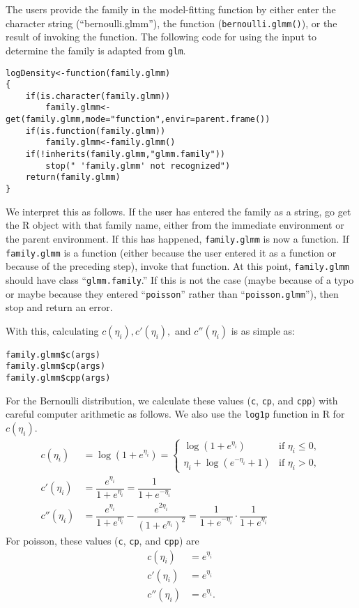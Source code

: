 \documentclass{article}
\begin{document}
The users provide the family in the model-fitting function by either enter the character string (``bernoulli.glmm''), the function (\texttt{bernoulli.glmm()}), or the result of invoking the function.  The following code for using the input to determine the family is adapted from \texttt{glm}.

\begin{verbatim}
logDensity<-function(family.glmm)
{
	if(is.character(family.glmm))
		family.glmm<-get(family.glmm,mode="function",envir=parent.frame())
	if(is.function(family.glmm))
		family.glmm<-family.glmm()
	if(!inherits(family.glmm,"glmm.family")) 
		stop(" 'family.glmm' not recognized") 
	return(family.glmm)
}
\end{verbatim}
We interpret this as follows.  If the user has entered the family as a string, go get the R object with that family name, either from the immediate environment or the parent environment.  If this has happened, \texttt{family.glmm} is now a function.  If \texttt{family.glmm} is a function (either because the user entered it as a function or because of the preceding step), invoke that function.  At this point, \texttt{family.glmm} should have  class ``\texttt{glmm.family}.'' If this is not the case (maybe because of a typo or maybe because they entered ``\texttt{poisson}'' rather than ``\texttt{poisson.glmm}''), then stop and return an error.

With this, calculating $c(\eta_i), c'(\eta_i),$ and  $c''(\eta_i)$ is as simple as: 
\begin{verbatim}
family.glmm$c(args)
family.glmm$cp(args)
family.glmm$cpp(args)
\end{verbatim}

For the Bernoulli distribution, we calculate these values (\texttt{c}, \texttt{cp}, and \texttt{cpp}) with careful computer arithmetic as follows. We also use the \texttt{log1p} function in R for $c(\eta_i)$. 
\begin{align}
c(\eta_i) &= \log(1+e^{\eta_i}) =
  \begin{cases}
    \log(1+e^{\eta_i}) & \text{if } \eta_i\leq 0,\\
    \eta_i+\log(e^{-\eta_i}+1) & \text{if } \eta_i >0,
  \end{cases}\\
c'(\eta_i)&=\dfrac{ e^{{\eta_{i}}}}{ 1+e^{{\eta_{i}}}} = \dfrac{1}{1+e^{-\eta_i}}\\
c''(\eta_i)&=   \dfrac{e^{{\eta_{i}}}}{  1+ e^{{\eta_{i}}} }  - \dfrac{e^{2{\eta_{i}}}}{    (  1+ e^{{\eta_{i}}})^2}  = \dfrac{1}{1+e^{-\eta_i}}\cdot \dfrac{1}{1+e^{\eta_i}}
\end{align}
 For poisson, these values (\texttt{c}, \texttt{cp}, and \texttt{cpp}) are
\begin{align}
c(\eta_i)&=e^{\eta_i}\\
c'(\eta_i)&=e^{{\eta_{i}}}\\
c''(\eta_i)&= e^{{\eta_{i}}}.
\end{align}
\end{document}
